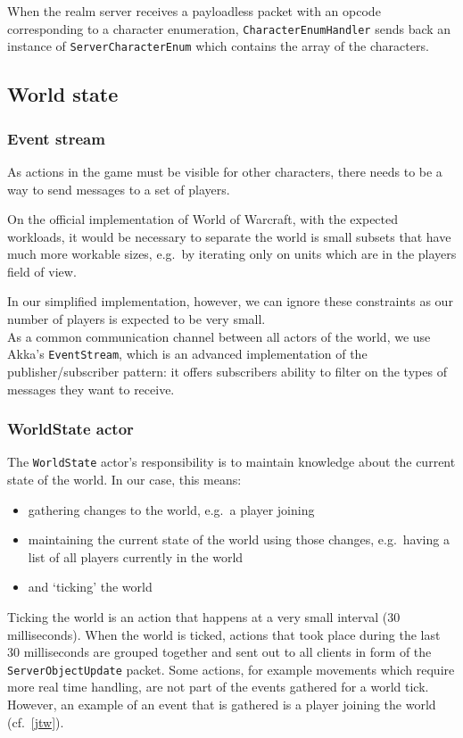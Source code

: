 \documentclass[paper=a4, fontsize=11pt]{scrartcl}
\begin{document}
When the realm server receives a payloadless packet with an opcode corresponding
to a character enumeration, \texttt{CharacterEnumHandler} sends back an instance
of \texttt{ServerCharacterEnum} which contains the array of the characters.

\subsection{World state}

\subsubsection{Event stream}

As actions in the game must be visible for other characters, there needs to
be a way to send messages to a set of players.

On the official implementation of World of Warcraft, with the expected
workloads, it would be necessary to separate the world is small subsets that have
much more workable sizes, e.g.\ by iterating only on units which are in the
players field of view.

In our simplified implementation, however, we can ignore these constraints as
our number of players is expected to be very small.\\

As a common communication channel between all actors of the world, we use Akka's
\texttt{EventStream}, which is an advanced implementation of the
publisher/subscriber pattern: it offers subscribers ability to filter on the
types of messages they want to receive.

\subsubsection{WorldState actor}

The \texttt{WorldState} actor's responsibility is to maintain knowledge about
the current state of the world.
In our case, this means:
\begin{itemize}
    \item gathering changes to the world, e.g.\ a player joining
    \item maintaining the current state of the world using those changes, e.g.\
        having a list of all players currently in the world
    \item and `ticking' the world
\end{itemize}

Ticking the world is an action that happens at a very small interval (30
milliseconds).
When the world is ticked, actions that took place during the last 30
milliseconds are grouped together and sent out to all clients in form of the
\texttt{ServerObjectUpdate} packet.
Some actions, for example movements which require more real time handling,
are not part of the events gathered for a world tick. However, an example of an
event that is gathered is a player joining the world (cf.~\ref{jtw}).
\end{document}
